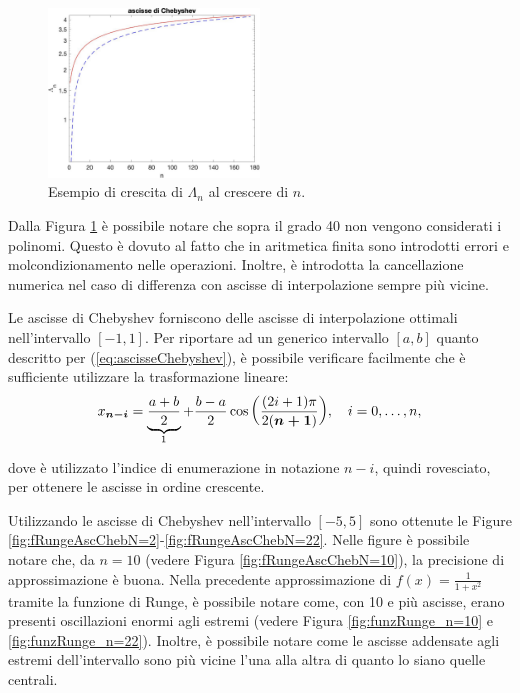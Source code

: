 
\begin{figure}
    \centering
    \includegraphics[width=0.5\textwidth]{immagini/graficoAscisseChebyshev.jpeg}
    \caption{Esempio di crescita di $\Lambda_n$ al crescere di $n$.}\label{fig:graficoAscisseChebyshev}
\end{figure}

Dalla Figura \ref{fig:graficoAscisseChebyshev} è possibile notare che sopra il grado 40 non vengono considerati i polinomi. Questo è dovuto al fatto che in aritmetica finita sono introdotti errori e molcondizionamento nelle operazioni. Inoltre, è introdotta la cancellazione numerica nel caso di differenza con ascisse di interpolazione sempre più vicine.

\begin{remark}
    Le ascisse di Chebyshev forniscono delle ascisse di interpolazione ottimali nell'intervallo $[-1,1]$. Per riportare ad un generico intervallo $[a,b]$ quanto descritto per (\ref{eq:ascisseChebyshev}), è possibile verificare facilmente che è sufficiente utilizzare la trasformazione lineare:
    \begin{equation*}
        x_{\boldsymbol{n-i}} =\underbrace{\frac{a+b}{2}}_{\footnotemark} + \frac{b-a}{2}\cos{\left(\frac{(2i+1)\pi}{2(\boldsymbol{n+1})}\right)},\quad i=0,\hdots,n,
    \end{equation*}
    dove è utilizzato l'indice di enumerazione in notazione $n-i$, quindi rovesciato, per ottenere le ascisse in ordine crescente. 
\end{remark}

Utilizzando le ascisse di Chebyshev nell'intervallo $[-5,5]$ sono ottenute le Figure \ref{fig:fRungeAscChebN=2}-\ref{fig:fRungeAscChebN=22}. Nelle figure è possibile notare che, da $n=10$ (vedere Figura \ref{fig:fRungeAscChebN=10}), la precisione di approssimazione è buona. Nella precedente approssimazione di $f(x)=\frac{1}{1+x^2}$ tramite la funzione di Runge, è possibile notare come, con 10 e più ascisse, erano presenti oscillazioni enormi agli estremi (vedere Figura \ref{fig:funzRunge_n=10} e \ref{fig:funzRunge_n=22}). Inoltre, è possibile notare come le ascisse addensate agli estremi dell'intervallo sono più vicine l'una alla altra di quanto lo siano quelle centrali.

